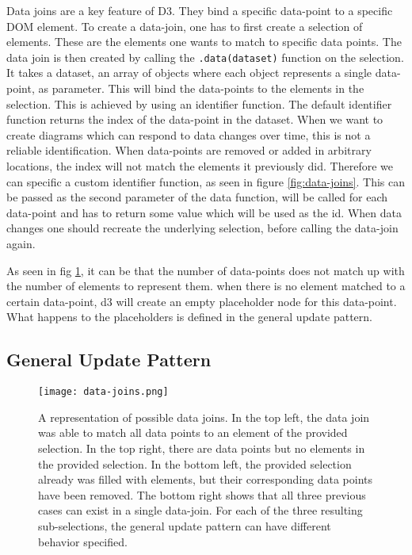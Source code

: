Data joins are a key feature of D3. They bind a specific data-point to a specific DOM element. To create a data-join, one has to first create a selection of elements. These are the elements one wants to match to specific data points. The data join is then created by calling the \verb|.data(dataset)| function on the selection. It takes a dataset, an array of objects where each object represents a single data-point, as parameter. This will bind the data-points to the elements in the selection. This is achieved by using an identifier function. The default identifier function returns the index of the data-point in the dataset. When we want to create diagrams which can respond to data changes over time, this is not a reliable identification. When data-points are removed or added in arbitrary locations, the index will not match the elements it previously did. Therefore we can specific a custom identifier function, as seen in figure \ref{fig:data-joins}. This can be passed as the second parameter of the data function, will be called for each data-point and has to return some value which will be used as the id. When data changes one should recreate the underlying selection, before calling the data-join again.

As seen in fig \ref{fig:general-update-pattern}, it can be that the number of data-points does not match up with the number of elements to represent them. when there is no element matched to a certain data-point, d3 will create an empty placeholder node for this data-point. What happens to the placeholders is defined in the general update pattern.

\subsection{General Update Pattern}



\begin{figure}
    \texttt{[image: data-joins.png]}
    \captionsetup{width=0.9\textwidth}
    \caption[general-update-pattern]{A representation of possible data joins. In the top left, the data join was able to match all data points to an element of the provided selection. In the top right, there are data points but no elements in the provided selection. In the bottom left, the provided selection already was filled with elements, but their corresponding data points have been removed. The bottom right shows that all three previous cases can exist in a single data-join. For each of the three resulting sub-selections, the general update pattern can have different behavior specified.}
    \label{fig:general-update-pattern}
\end{figure}



